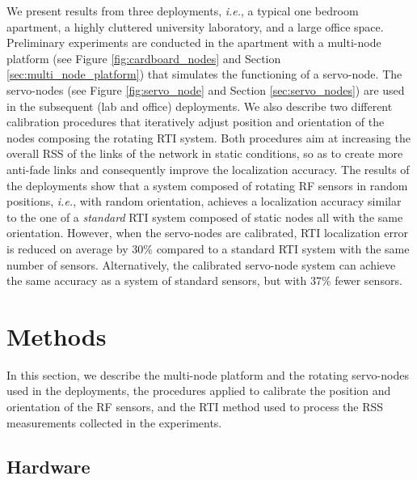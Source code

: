 \documentclass[conference]{IEEEtran}
\begin{document}
We present results from three deployments, \emph{i.e.}, a typical one bedroom apartment, a highly cluttered university laboratory, and a large office space. Preliminary experiments are conducted in the apartment with a multi-node platform (see Figure \ref{fig:cardboard_nodes} and Section \ref{sec:multi_node_platform}) that simulates the functioning of a servo-node. The servo-nodes (see Figure \ref{fig:servo_node} and Section \ref{sec:servo_nodes}) are used in the subsequent (lab and office) deployments. We also describe two different calibration procedures that iteratively adjust position and orientation of the nodes composing the rotating RTI system. Both procedures aim at increasing the overall RSS of the links of the network in static conditions, so as to create more anti-fade links and consequently improve the localization accuracy. The results of the deployments show that a system composed of rotating RF sensors in random positions, \emph{i.e.}, with random orientation, achieves a localization accuracy similar to the one of a \emph{standard} RTI system composed of static nodes all with the same orientation. However, when the servo-nodes are calibrated, RTI localization error is reduced on average by 30\% compared to a standard RTI system with the same number of sensors.  Alternatively, the calibrated servo-node system can achieve the same accuracy as a system of standard sensors, but with 37\% fewer sensors.


















\section{Methods}
\label{sec:methods}

In this section, we describe the multi-node platform and the rotating servo-nodes used in the deployments, the procedures applied to calibrate the position and orientation of the RF sensors, and the RTI method used to process the RSS measurements collected in the experiments.



\subsection{Hardware}
\label{sec:hardware}
\end{document}
